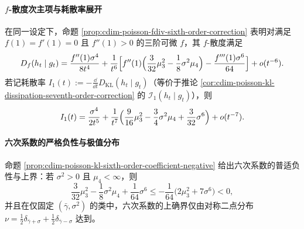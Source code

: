 \paragraph{\texorpdfstring{$f$}{f}-散度次主项与耗散率展开}
在同一设定下，命题 \ref{prop:cdim-poisson-fdiv-sixth-order-correction} 表明对满足 \(f(1)=f'(1)=0\) 且 \(f''(1)>0\) 的三阶可微 \(f\)，其 \(f\)-散度满足
\[
D_f(h_t\mid g_t)
=\frac{f''(1)\sigma^4}{8t^4}
+\frac{1}{t^6}\Bigl[
f''(1)\Bigl(\frac{3}{32}\mu_3^2-\frac18\sigma^2\mu_4\Bigr)-\frac{f'''(1)\sigma^6}{64}
\Bigr]+o(t^{-6}).
\]
若记耗散率 \(I_1(t):=-\frac{\dd}{\dd t}D_{\mathrm{KL}}(h_t\mid g_t)\)（等价于推论 \ref{cor:cdim-poisson-kl-dissipation-seventh-order-correction} 的 \(\mathcal I_1(h_t\mid g_t)\)），则
\[
I_1(t)=\frac{\sigma^4}{2t^5}
+\frac{1}{t^7}\Bigl(\frac{9}{16}\mu_3^2-\frac34\sigma^2\mu_4+\frac{3}{32}\sigma^6\Bigr)+o(t^{-7}).
\]

\paragraph{六次系数的严格负性与极值分布}
命题 \ref{prop:cdim-poisson-kl-sixth-order-coefficient-negative} 给出六次系数的普适负性与上界：若 \(\sigma^2>0\) 且 \(\mu_4<\infty\)，则
\[
\frac{3}{32}\mu_3^2-\frac18\sigma^2\mu_4+\frac{1}{64}\sigma^6
\le -\frac{1}{64}\bigl(2\mu_3^2+7\sigma^6\bigr)<0,
\]
并且在仅固定 \((\bar\gamma,\sigma^2)\) 的类中，六次系数的上确界仅由对称二点分布
\(
\nu=\frac12\delta_{\bar\gamma+\sigma}+\frac12\delta_{\bar\gamma-\sigma}
\)
达到。

\endinput

